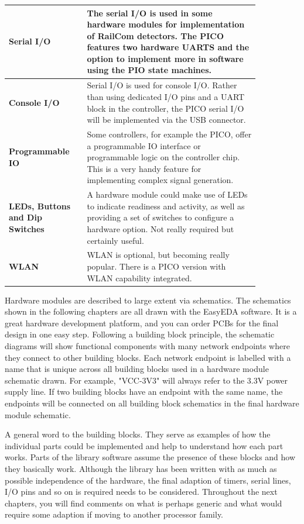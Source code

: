 \begin{longtable}{@{}p{0.25\linewidth}p{0.6\linewidth}@{}}
    \midrule
    \textbf{Serial I/O} & The serial I/O is used in some hardware modules for implementation of RailCom detectors. The PICO features two hardware UARTS and the option to implement more in software using the PIO state machines. \\
    \midrule
    \textbf{Console I/O} & Serial I/O is used for console I/O. Rather than using dedicated I/O pins and a UART block in the controller, the PICO serial I/O will be implemented via the USB connector. \\
    \midrule
    \textbf{Programmable IO} & Some controllers, for example the PICO, offer a programmable IO interface or programmable logic on the controller chip. This is a very handy feature for implementing complex signal generation. \\
    \midrule
    \textbf{LEDs, Buttons and Dip Switches} & A hardware module could make use of LEDs to indicate readiness and activity, as well as providing a set of switches to configure a hardware option. Not really required but certainly useful. \\
    \midrule
    \textbf{WLAN} & WLAN is optional, but becoming really popular. There is a PICO version with WLAN capability integrated. \\
\end{longtable}


Hardware modules are described to large extent via schematics. The schematics shown in the following chapters are all drawn with the EasyEDA software. It is a great hardware development platform, and you can order PCBs for the final design in one easy step. Following a building block principle, the schematic diagrams will show functional components with many network endpoints where they connect to other building blocks. Each network endpoint is labelled with a name that is unique across all building blocks used in a hardware module schematic drawn. For example, "VCC-3V3" will always refer to the 3.3V power supply line. If two building blocks have an endpoint with the same name, the endpoints will be connected on all building block schematics in the final hardware module schematic.

A general word to the building blocks. They serve as examples of how the individual parts could be implemented and help to understand how each part works. Parts of the library software assume the presence of these blocks and how they basically work. Although the library has been written with as much as possible independence of the hardware, the final adaption of timers, serial lines, I/O pins and so on is required needs to be considered. Throughout the next chapters, you will find comments on what is perhaps generic and what would require some adaption if moving to another processor family.


